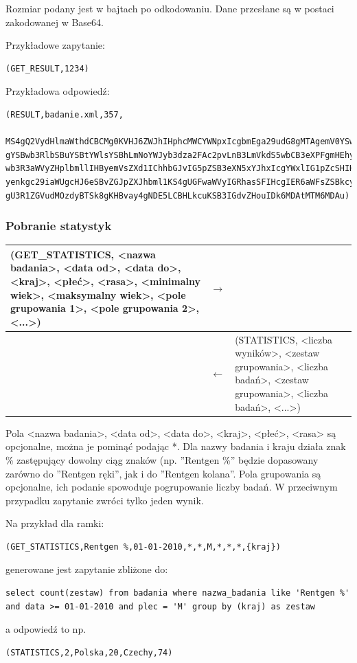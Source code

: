Rozmiar podany jest w bajtach po odkodowaniu.
Dane przesłane są w postaci zakodowanej w Base64.

Przykładowe zapytanie:
\begin{lstlisting}[style=incode]
(GET_RESULT,1234)
\end{lstlisting}
Przykładowa odpowiedź:
\begin{lstlisting}[style=incode]
(RESULT,badanie.xml,357,
 MS4gQ2VydHlmaWthdCBCMg0KVHJ6ZWJhIHphcMWCYWNpxIcgbmEga29udG8gMTAgemV0YSw
gYSBwb3RlbSBuYSBtYWlsYSBhLmNoYWJyb3dza2FAc2pvLnB3LmVkdS5wbCB3eXPFgmHEhyB
wb3R3aWVyZHplbmllIHByemVsZXd1IChhbGJvIG5pZSB3eXN5xYJhxIcgYWxlIG1pZcSHIHB
yenkgc29iaWUgcHJ6eSBvZGJpZXJhbml1KS4gUGFwaWVyIGRhasSFIHcgIER6aWFsZSBkcy4
gU3R1ZGVudMOzdyBTSk8gKHBvay4gNDE5LCBHLkcuKSB3IGdvZHouIDk6MDAtMTM6MDAu)
\end{lstlisting}


\subsubsection{Pobranie statystyk}

\begin{longtable}{| p{} | p{}| p{} |} 
\hline
(GET\_STATISTICS, <nazwa badania>, <data od>, <data do>, <kraj>, <płeć>, <rasa>, <minimalny wiek>, <maksymalny wiek>, {<pole grupowania 1>, <pole grupowania 2>, <...>}) & $\rightarrow$ &  \\ \hline
 & $\leftarrow$ & (STATISTICS, <liczba wyników>, <zestaw grupowania>, <liczba badań>, <zestaw grupowania>, <liczba badań>, <...>) \\ \hline
\end{longtable}

Pola <nazwa badania>, <data od>, <data do>, <kraj>, <płeć>, <rasa> są opcjonalne, można je pominąć podając *. Dla nazwy badania i kraju działa znak \% zastępujący dowolny ciąg znaków (np. ''Rentgen \%'' będzie dopasowany zarówno do ''Rentgen ręki'', jak i do ''Rentgen kolana''.
Pola grupowania są opcjonalne, ich podanie spowoduje pogrupowanie liczby badań. W przeciwnym przypadku zapytanie zwróci tylko jeden wynik.

Na przykład dla ramki:
\begin{lstlisting}[style=incode]
(GET_STATISTICS,Rentgen %,01-01-2010,*,*,M,*,*,*,{kraj})
\end{lstlisting}
generowane jest zapytanie zbliżone do:
\begin{lstlisting}[style=incode]
select count(zestaw) from badania where nazwa_badania like 'Rentgen %'
and data >= 01-01-2010 and plec = 'M' group by (kraj) as zestaw
\end{lstlisting}
a odpowiedź to np.
\begin{lstlisting}[style=incode]
(STATISTICS,2,Polska,20,Czechy,74)
\end{lstlisting}

